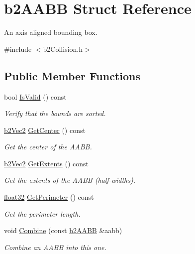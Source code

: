\hypertarget{structb2_a_a_b_b}{}\section{b2\+A\+A\+BB Struct Reference}
\label{structb2_a_a_b_b}


An axis aligned bounding box.  




{\ttfamily \#include $<$b2\+Collision.\+h$>$}

\subsection*{Public Member Functions}
\begin{DoxyCompactItemize}
\item 
bool \mbox{\hyperlink{structb2_a_a_b_b_a70bb45c086fcc2d7ee8694deb386070e}{Is\+Valid}} () const
\begin{DoxyCompactList}\small\item\em Verify that the bounds are sorted. \end{DoxyCompactList}\item 
\mbox{\hyperlink{structb2_vec2}{b2\+Vec2}} \mbox{\hyperlink{structb2_a_a_b_b_a2c4051e79001a3166cc7f8ad811137fe}{Get\+Center}} () const
\begin{DoxyCompactList}\small\item\em Get the center of the A\+A\+BB. \end{DoxyCompactList}\item 
\mbox{\hyperlink{structb2_vec2}{b2\+Vec2}} \mbox{\hyperlink{structb2_a_a_b_b_a2a4f550a18d2a0895fbc5c4d3ec17d22}{Get\+Extents}} () const
\begin{DoxyCompactList}\small\item\em Get the extents of the A\+A\+BB (half-\/widths). \end{DoxyCompactList}\item 
\mbox{\hyperlink{b2_settings_8h_aacdc525d6f7bddb3ae95d5c311bd06a1}{float32}} \mbox{\hyperlink{structb2_a_a_b_b_a25d2504d2f2fdec88f9347f62f112268}{Get\+Perimeter}} () const
\begin{DoxyCompactList}\small\item\em Get the perimeter length. \end{DoxyCompactList}\item 
void \mbox{\hyperlink{structb2_a_a_b_b_ad551edba62d2ad6094672a9ba3e26496}{Combine}} (const \mbox{\hyperlink{structb2_a_a_b_b}{b2\+A\+A\+BB}} \&aabb)
\begin{DoxyCompactList}\small\item\em Combine an A\+A\+BB into this one. \end{DoxyCompactList}\item 

\end{DoxyCompactItemize}
